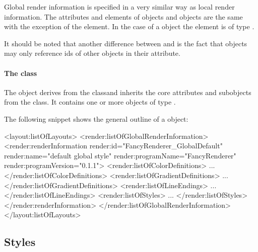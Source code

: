 Global render information is specified in a very similar way as local render information. The attributes and elements of \GlobalRenderInformation objects and 
\LocalRenderInformation objects are the same with the exception of the  element. In the case of a \GlobalRenderInformation object the  element is of type \ListOfGlobalStyles.

It should be noted that another difference between \GlobalRenderInformation and \LocalRenderInformation is the 
fact that \GlobalRenderInformation objects may only reference ids of other 
\GlobalRenderInformation objects in their  attribute. 

\paragraph{The  class}
\label{listofglobalstyles-class}

The \ListOfGlobalStyles object derives from the  classand inherits
the core attributes and subobjects from the  class. It
contains one or more objects of type \GlobalStyle.

\vspace{0.25cm}
The following snippet shows the general outline of a \ListOfGlobalRenderInformation object:


{\footnotesize
\begin{example}
<layout:listOfLayouts>
   <render:listOfGlobalRenderInformation>
      <render:renderInformation render:id="FancyRenderer_GlobalDefault" 
                         render:name="default global style" 
                         render:programName="FancyRenderer" 
                         render:programVersion="0.1.1">
        <render:listOfColorDefinitions>
             ...
        </render:listOfColorDefinitions>
        <render:listOfGradientDefinitions>
             ...
        </render:listOfGradientDefinitions>
        <render:listOfLineEndings>
             ...
        </render:listOfLineEndings>
        <render:listOfStyles>
             ...
        </render:listOfStyles>
      </render:renderInformation>
   </render:listOfGlobalRenderInformation>
</layout:listOfLayouts>
\end{example}
}
\subsection{Styles}
\label{style-class}

